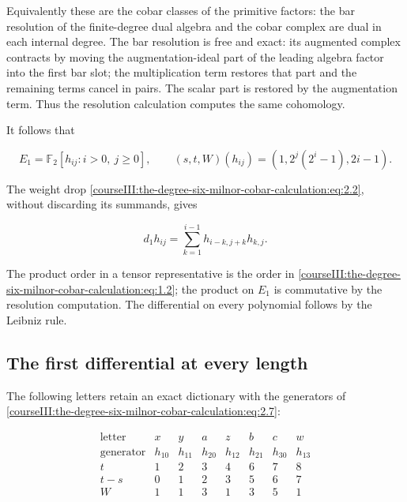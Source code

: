 Equivalently these are the cobar classes of the primitive factors: the bar resolution of the finite-degree dual algebra and the cobar complex are dual in each internal degree. The bar resolution is free and exact: its augmented complex contracts by moving the augmentation-ideal part of the leading algebra factor into the first bar slot; the multiplication term restores that part and the remaining terms cancel in pairs. The scalar part is restored by the augmentation term. Thus the resolution calculation computes the same cohomology.

It follows that

\begin{equation}
E_1=\mathbb F _2[h_{ij}:i>0,\ j\geq0],\qquad
 (s,t,W)(h_{ij})=(1,2^j(2^i-1),2i-1).
 \label{courseIII:the-degree-six-milnor-cobar-calculation:eq:2.7}
\end{equation}

The weight drop \eqref{courseIII:the-degree-six-milnor-cobar-calculation:eq:2.2}, without discarding its summands, gives

\begin{equation}
d_1h_{ij}=\sum_{k=1}^{i-1}h_{i-k,j+k}h_{k,j}.
 \label{courseIII:the-degree-six-milnor-cobar-calculation:eq:2.8}
\end{equation}

The product order in a tensor representative is the order in \eqref{courseIII:the-degree-six-milnor-cobar-calculation:eq:1.2}; the product on \(E_1\) is commutative by the resolution computation. The differential on every polynomial follows by the Leibniz rule.

\label{courseIII:the-degree-six-milnor-cobar-calculation:six-cobar-all-lengths}

\subsection{The first differential at every length}
\label{courseIII:the-degree-six-milnor-cobar-calculation:section-3}

The following letters retain an exact dictionary with the generators of \eqref{courseIII:the-degree-six-milnor-cobar-calculation:eq:2.7}:

\begin{equation}
\begin{array}{c|rrrrrrr}
 \text{letter}&x&y&a&z&b&c&w\\ \hline
 \text{generator}&h_{10}&h_{11}&h_{20}&h_{12}&h_{21}&h_{30}&h_{13}\\
 t&1&2&3&4&6&7&8\\
 t-s&0&1&2&3&5&6&7\\
 W&1&1&3&1&3&5&1
\end{array}
\label{courseIII:the-degree-six-milnor-cobar-calculation:eq:3.1}
\end{equation}

